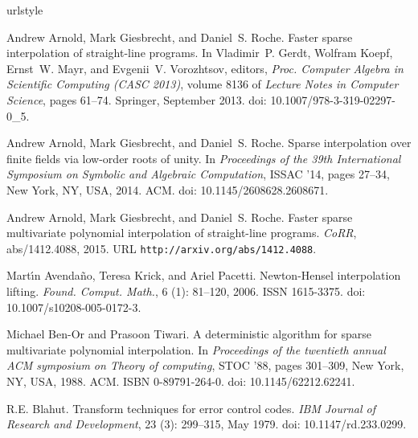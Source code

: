 \documentclass[letterpaper,10pt]{article}
\begin{document}
\newcommand{\Gathen}{\relax}\newcommand{\Hoeven}{\relax}
\begin{thebibliography}{21}
\providecommand{\natexlab}[1]{#1}
\providecommand{\url}[1]{\texttt{#1}}
\expandafter\ifx\csname urlstyle\endcsname\relax
  \providecommand{\doi}[1]{doi: #1}\else
  \providecommand{\doi}{doi: \begingroup \urlstyle{rm}\Url}\fi

Andrew Arnold, Mark Giesbrecht, and Daniel~S. Roche.
\newblock Faster sparse interpolation of straight-line programs.
\newblock In Vladimir~P. Gerdt, Wolfram Koepf, Ernst~W. Mayr, and Evgenii~V.
  Vorozhtsov, editors, \emph{Proc. Computer Algebra in Scientific Computing
  (CASC 2013)}, volume 8136 of \emph{Lecture Notes in Computer Science}, pages
  61--74. Springer, September 2013.
\newblock \doi{10.1007/978-3-319-02297-0_5}.

Andrew Arnold, Mark Giesbrecht, and Daniel~S. Roche.
\newblock Sparse interpolation over finite fields via low-order roots of unity.
\newblock In \emph{Proceedings of the 39th International Symposium on Symbolic
  and Algebraic Computation}, ISSAC '14, pages 27--34, New York, NY, USA, 2014.
  ACM.
\newblock \doi{10.1145/2608628.2608671}.

Andrew Arnold, Mark Giesbrecht, and Daniel~S. Roche.
\newblock Faster sparse multivariate polynomial interpolation of straight-line
  programs.
\newblock \emph{CoRR}, abs/1412.4088, 2015.
\newblock URL \url{http://arxiv.org/abs/1412.4088}.

Mart{\'{\i}}n Avenda{\~n}o, Teresa Krick, and Ariel Pacetti.
\newblock Newton-{H}ensel interpolation lifting.
\newblock \emph{Found. Comput. Math.}, 6 (1): 81--120, 2006.
\newblock ISSN 1615-3375.
\newblock \doi{10.1007/s10208-005-0172-3}.

Michael Ben-Or and Prasoon Tiwari.
\newblock A deterministic algorithm for sparse multivariate polynomial
  interpolation.
\newblock In \emph{Proceedings of the twentieth annual ACM symposium on Theory
  of computing}, STOC '88, pages 301--309, New York, NY, USA, 1988. ACM.
\newblock ISBN 0-89791-264-0.
\newblock \doi{10.1145/62212.62241}.

R.E. Blahut.
\newblock Transform techniques for error control codes.
\newblock \emph{IBM Journal of Research and Development}, 23
  (3): 299--315, May 1979.
\newblock \doi{10.1147/rd.233.0299}.


\end{thebibliography}
\end{document}
